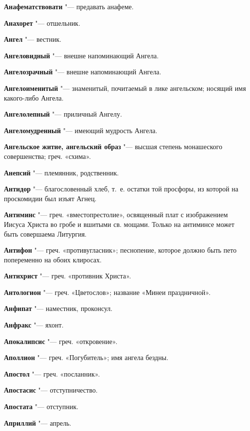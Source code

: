 \begin{mymulticols}
\noindent\textbf{Анафематствовати} "--- предавать анафеме. 

\noindent\textbf{Анахорет} "--- отшельник. 

\noindent\textbf{Ангел} "--- вестник. 

\noindent\textbf{Ангеловидный} "--- внешне напоминающий Ангела. 

\noindent\textbf{Ангелозрачный} "--- внешне напоминающий Ангела. 

\noindent\textbf{Ангелоименитый} "--- знаменитый, почитаемый в лике ангельском; носящий имя какого-либо Ангела. 

\noindent\textbf{Ангелолепный} "--- приличный Ангелу. 

\noindent\textbf{Ангеломудренный} "--- имеющий мудрость Ангела. 

\noindent\textbf{Ангельское житие, ангельский образ} "--- высшая степень монашеского совершенства; греч. «схима». 

\noindent\textbf{Анепсий} "--- племянник, родственник. 

\noindent\textbf{Антидор} "--- благословенный хлеб, т.~е. остатки той просфоры, из которой на проскомидии был изъят Агнец. 

\noindent\textbf{Антиминс} "--- греч. «вместопрестолие», освященный плат с изображением Иисуса Христа во гробе и вшитыми св. мощами. Только на антиминсе может быть совершаема Литургия. 

\noindent\textbf{Антифон} "--- греч. «противугласник»; песнопение, которое должно быть пето попеременно на обоих клиросах. 

\noindent\textbf{Антихрист} "--- греч. «противник Христа». 

\noindent\textbf{Антологион} "--- греч. «Цветослов»; название «Минеи праздничной». 

\noindent\textbf{Анфипат} "--- наместник, проконсул. 

\noindent\textbf{Анфракс} "--- яхонт. 

\noindent\textbf{Апокалипсис} "--- греч. «откровение». 

\noindent\textbf{Аполлион} "--- греч. «Погубитель»; имя ангела бездны. 

\noindent\textbf{Апостол} "--- греч. «посланник». 

\noindent\textbf{Апостасис} "--- отступничество. 

\noindent\textbf{Апостата} "--- отступник. 

\noindent\textbf{Априллий} "--- апрель. 


\end{mymulticols}
